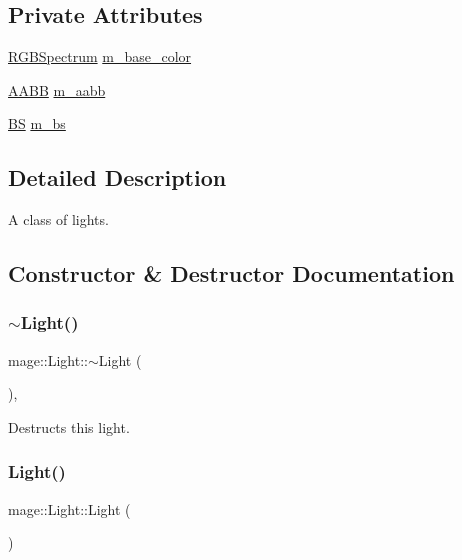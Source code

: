 \subsection*{Private Attributes}
\begin{DoxyCompactItemize}
\item 
\hyperlink{structmage_1_1_r_g_b_spectrum}{R\+G\+B\+Spectrum} \hyperlink{classmage_1_1_light_a5939d408a9b547de5af52229060650ab}{m\+\_\+base\+\_\+color}
\item 
\hyperlink{structmage_1_1_a_a_b_b}{A\+A\+BB} \hyperlink{classmage_1_1_light_a2c9190a763a1f37f7639a02bef01279d}{m\+\_\+aabb}
\item 
\hyperlink{structmage_1_1_b_s}{BS} \hyperlink{classmage_1_1_light_a926df9e12442c630d252fae852b8fc57}{m\+\_\+bs}
\end{DoxyCompactItemize}


\subsection{Detailed Description}
A class of lights. 

\subsection{Constructor \& Destructor Documentation}
\hypertarget{classmage_1_1_light_af877bc473dede83689a4bda8a36d4d36}{}\label{classmage_1_1_light_af877bc473dede83689a4bda8a36d4d36} 
\subsubsection{\texorpdfstring{$\sim$\+Light()}{~Light()}}
{\footnotesize\ttfamily mage\+::\+Light\+::$\sim$\+Light (\begin{DoxyParamCaption}{ }\end{DoxyParamCaption})\hspace{0.3cm}{\ttfamily [virtual]}, {\ttfamily [default]}}

Destructs this light. \hypertarget{classmage_1_1_light_a5c1b256aef7e22faafcce7ea2fa8f858}{}\label{classmage_1_1_light_a5c1b256aef7e22faafcce7ea2fa8f858} 
\subsubsection{\texorpdfstring{Light()}{Light()}\hspace{0.1cm}{\footnotesize\ttfamily [1/3]}}
{\footnotesize\ttfamily mage\+::\+Light\+::\+Light (\begin{DoxyParamCaption}{ }\end{DoxyParamCaption})\hspace{0.3cm}{\ttfamily [protected]}}

